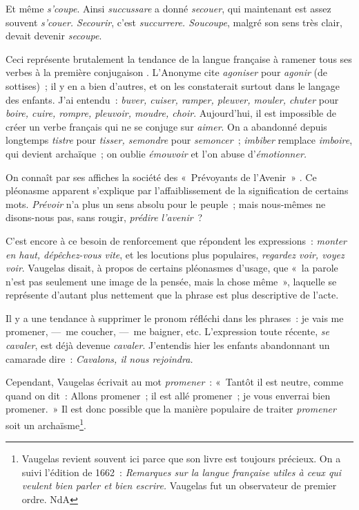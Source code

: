\documentclass[french,twoside]{book} %
\def\mednobreak{\ifdim\lastskip<\medskipamount
  \removelastskip\nopagebreak\medskip\fi}
\newcommand{\labelblock}[1]{\medbreak{\noindent\color{rubric}\bfseries #1}\par\mednobreak}
\begin{document}
\labelblock{{\itshape Secoupe.}}

\noindent Et même {\itshape s’coupe}. Ainsi {\itshape succussare} a donné {\itshape secouer}, qui maintenant est assez souvent {\itshape s’couer. Secourir}, c’est {\itshape succurrere. Soucoupe}, malgré son sens très clair, devait devenir {\itshape secoupe}.\par

\labelblock{{\itshape Vous faisez.}}

\noindent Ceci représente brutalement la tendance de la langue française à ramener tous ses verbes à la première conjugaison . L’Anonyme cite {\itshape agoniser} pour {\itshape agonir} (de sottises) ; il y en a bien d’autres, et on les constaterait surtout dans le langage des enfants. J’ai entendu : {\itshape buver, cuiser, ramper, pleuver, mouler, chuter} pour {\itshape boire, cuire, rompre, pleuvoir, moudre, choir}. Aujourd’hui, il est impossible de créer un verbe français qui ne se conjuge sur {\itshape aimer}. On a abandonné depuis longtemps {\itshape tistre} pour {\itshape tisser, semondre} pour {\itshape semoncer} ; {\itshape imbiber} remplace {\itshape imboire}, qui devient archaïque ; on oublie {\itshape émouvoir} et l’on abuse d’{\itshape émotionner.}\par

\labelblock{{\itshape Prévu d’avance.}}

\noindent On connaît par ses affiches la société des « Prévoyants de l’Avenir » . Ce pléonasme apparent s’explique par l’affaiblissement de la signification de certains mots. {\itshape Prévoir} n’a plus un sens absolu pour le peuple ; mais nous-mêmes ne disons-nous pas, sans rougir, {\itshape prédire l’avenir} ?\par
C’est encore à ce besoin de renforcement que répondent les expressions : {\itshape monter en haut, dépêchez-vous vite}, et les locutions plus populaires, {\itshape regardez voir, voyez voir}. Vaugelas disait, à propos de certains pléonasmes d’usage, que « la parole n’est pas seulement une image de la pensée, mais la chose même », laquelle se représente d’autant plus nettement que la phrase est plus descriptive de l’acte.\par

\labelblock{{\itshape Promener.}}

\noindent Il y a une tendance à supprimer le pronom réfléchi dans les phrases : je vais me promener, — me coucher, — me baigner, etc. L’expression toute récente, {\itshape se cavaler}, est déjà devenue {\itshape cavaler}. J’entendis hier les enfants abandonnant un camarade dire : {\itshape Cavalons, il nous rejoindra.}\par
Cependant, Vaugelas écrivait au mot {\itshape promener} : « Tantôt il est neutre, comme quand on dit : Allons promener ; il est allé promener ; je vous enverrai bien promener. » Il est donc possible que la manière populaire de traiter {\itshape promener} soit un archaïsme\footnote{ Vaugelas revient souvent ici parce que son livre est toujours précieux. On a suivi l’édition de 1662 : {\itshape Remarques sur la langue française utiles à ceux qui veulent bien parler et bien escrire.} Vaugelas fut un observateur de premier ordre. NdA}.\par
\end{document}
